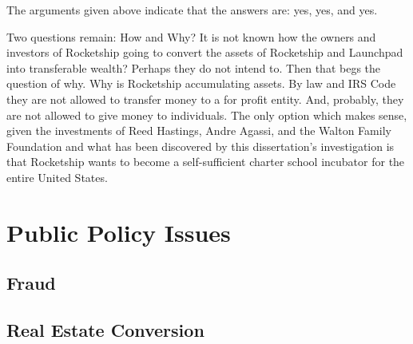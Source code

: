 The arguments given above indicate that the answers are: yes, yes, and yes.

Two questions remain: How and Why? It is not known how the owners and investors of Rocketship going to convert the assets of Rocketship and Launchpad into transferable wealth? Perhaps they do not intend to. Then that begs the question of why. Why is Rocketship accumulating assets. By law and IRS Code they are not allowed to transfer money to a for profit entity. And, probably, they are not allowed to give money to individuals. The only option which makes sense, given the investments of Reed Hastings, Andre Agassi, and the Walton Family Foundation and what has been discovered by this dissertation's investigation is that Rocketship wants to become a self-sufficient charter school incubator for the entire United States.

\section{Public Policy Issues}%
\label{sec:publ-policy-chang}\indent%

\subsection{Fraud}
\label{sec:fraud}

\subsection{Real Estate Conversion}
\label{sec:real-estate-conv}

